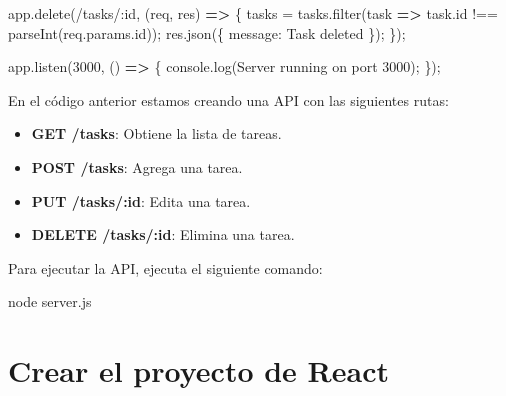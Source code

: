 \documentclass[
  a4paper,
  DIV=11,
  numbers=noendperiod,
  onepage,
  openany]{scrreprt}
\newenvironment{Shaded}{\begin{snugshade}}{\end{snugshade}}
\newcommand{\AttributeTok}[1]{\textcolor[rgb]{0.40,0.45,0.13}{#1}}
\newcommand{\BuiltInTok}[1]{\textcolor[rgb]{0.00,0.23,0.31}{#1}}
\newcommand{\DataTypeTok}[1]{\textcolor[rgb]{0.68,0.00,0.00}{#1}}
\newcommand{\DecValTok}[1]{\textcolor[rgb]{0.68,0.00,0.00}{#1}}
\newcommand{\ExtensionTok}[1]{\textcolor[rgb]{0.00,0.23,0.31}{#1}}
\newcommand{\FunctionTok}[1]{\textcolor[rgb]{0.28,0.35,0.67}{#1}}
\newcommand{\KeywordTok}[1]{\textcolor[rgb]{0.00,0.23,0.31}{\textbf{#1}}}
\newcommand{\NormalTok}[1]{\textcolor[rgb]{0.00,0.23,0.31}{#1}}
\newcommand{\OperatorTok}[1]{\textcolor[rgb]{0.37,0.37,0.37}{#1}}
\newcommand{\PreprocessorTok}[1]{\textcolor[rgb]{0.68,0.00,0.00}{#1}}
\newcommand{\StringTok}[1]{\textcolor[rgb]{0.13,0.47,0.30}{#1}}
\providecommand{\tightlist}{%
  \setlength{\itemsep}{0pt}\setlength{\parskip}{0pt}}\usepackage{longtable,booktabs,array}
\begin{document}
\begin{tcolorbox}
\begin{Shaded}
\begin{Highlighting}[]
\NormalTok{app}\OperatorTok{.}\FunctionTok{delete}\NormalTok{(}\StringTok{\textquotesingle{}/tasks/:id\textquotesingle{}}\OperatorTok{,}\NormalTok{ (req}\OperatorTok{,}\NormalTok{ res) }\KeywordTok{=\textgreater{}}\NormalTok{ \{}
\NormalTok{  tasks }\OperatorTok{=}\NormalTok{ tasks}\OperatorTok{.}\FunctionTok{filter}\NormalTok{(task }\KeywordTok{=\textgreater{}}\NormalTok{ task}\OperatorTok{.}\AttributeTok{id} \OperatorTok{!==} \PreprocessorTok{parseInt}\NormalTok{(req}\OperatorTok{.}\AttributeTok{params}\OperatorTok{.}\AttributeTok{id}\NormalTok{))}\OperatorTok{;}
\NormalTok{  res}\OperatorTok{.}\FunctionTok{json}\NormalTok{(\{ }\DataTypeTok{message}\OperatorTok{:} \StringTok{\textquotesingle{}Task deleted\textquotesingle{}}\NormalTok{ \})}\OperatorTok{;}
\NormalTok{\})}\OperatorTok{;}

\NormalTok{app}\OperatorTok{.}\FunctionTok{listen}\NormalTok{(}\DecValTok{3000}\OperatorTok{,}\NormalTok{ () }\KeywordTok{=\textgreater{}}\NormalTok{ \{}
  \BuiltInTok{console}\OperatorTok{.}\FunctionTok{log}\NormalTok{(}\StringTok{\textquotesingle{}Server running on port 3000\textquotesingle{}}\NormalTok{)}\OperatorTok{;}
\NormalTok{\})}\OperatorTok{;}
\end{Highlighting}
\end{Shaded}

En el código anterior estamos creando una API con las siguientes rutas:

\begin{itemize}
\tightlist
\item
  \textbf{GET /tasks}: Obtiene la lista de tareas.
\item
  \textbf{POST /tasks}: Agrega una tarea.
\item
  \textbf{PUT /tasks/:id}: Edita una tarea.
\item
  \textbf{DELETE /tasks/:id}: Elimina una tarea.
\end{itemize}

Para ejecutar la API, ejecuta el siguiente comando:

\begin{Shaded}
\begin{Highlighting}[]
\ExtensionTok{node}\NormalTok{ server.js}
\end{Highlighting}
\end{Shaded}

\section{Crear el proyecto de React}\label{crear-el-proyecto-de-react}


\end{tcolorbox}
\end{document}
